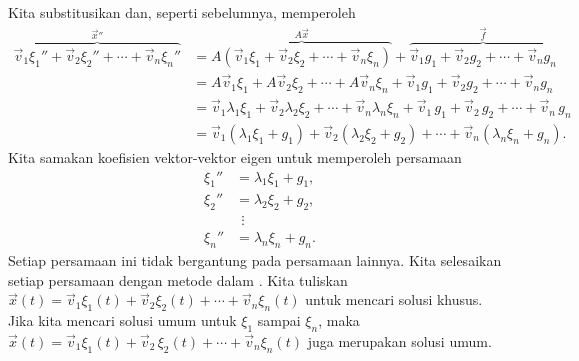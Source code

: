 Kita substitusikan dan, seperti sebelumnya, memperoleh
\begin{equation*}
\begin{split}
\overbrace{
\vec{v}_1 \xi_1'' + 
\vec{v}_2 \xi_2'' + \cdots +
\vec{v}_n \xi_n''
}^{{\vec{x}}''}
& =
\overbrace{
A \left( \vec{v}_1 \xi_1 + 
\vec{v}_2 \xi_2 + \cdots +
\vec{v}_n \xi_n \right)
}^{A\vec{x}}
+
\overbrace{
\vec{v}_1 g_1 + 
\vec{v}_2 g_2 + \cdots +
\vec{v}_n g_n
}^{\vec{f}}
\\
& = 
A \vec{v}_1 \xi_1 + 
A \vec{v}_2 \xi_2 + \cdots +
A \vec{v}_n \xi_n
+
\vec{v}_1 g_1 + 
\vec{v}_2 g_2 + \cdots +
\vec{v}_n g_n
\\
& =
\vec{v}_1 \lambda_1 \xi_1 + 
\vec{v}_2 \lambda_2 \xi_2 + \cdots +
\vec{v}_n \lambda_n \xi_n
+
\vec{v}_1 \, g_1 + 
\vec{v}_2 \, g_2 + \cdots +
\vec{v}_n \, g_n
\\
& =
\vec{v}_1 ( \lambda_1 \xi_1 + g_1 ) +
\vec{v}_2 ( \lambda_2 \xi_2 + g_2 ) + \cdots + 
\vec{v}_n ( \lambda_n \xi_n + g_n ) .
\end{split}
\end{equation*}
Kita samakan koefisien vektor-vektor eigen untuk memperoleh persamaan
\begin{align*}
\xi_1'' & = \lambda_1 \xi_1 + g_1 , \\
\xi_2'' & = \lambda_2 \xi_2 + g_2 , \\
& ~~ \vdots \\
\xi_n'' & = \lambda_n \xi_n + g_n .
\end{align*}
Setiap persamaan ini tidak bergantung pada persamaan lainnya.
Kita selesaikan setiap persamaan dengan metode dalam .
Kita tuliskan
$\vec{x}(t) =
\vec{v}_1 \xi_1(t) +
\vec{v}_2 \xi_2(t) + \cdots +
\vec{v}_n \xi_n(t)$ untuk mencari solusi khusus.
Jika kita mencari solusi umum untuk $\xi_1$ sampai $\xi_n$, maka
$\vec{x}(t) =
\vec{v}_1 \xi_1(t) + \vec{v}_2 \, \xi_2(t) + \cdots +
\vec{v}_n \xi_n(t)$ juga merupakan solusi umum.

